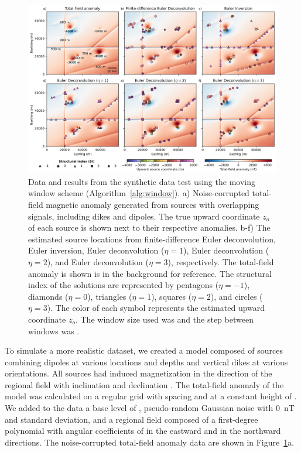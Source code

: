 \begin{figure}[tb!]
\centering
\includegraphics[width=1\linewidth]{figures/synthetic-windows.png}
\caption{
    Data and results from the synthetic data test using the moving window scheme (Algorithm~\ref{alg:window}).
    a) Noise-corrupted total-field magnetic anomaly generated from \SynWinNSources{} sources with overlapping signals, including dikes and dipoles. The true upward coordinate $z_o$ of each source is shown next to their respective anomalies.
    b-f) The estimated source locations from finite-difference Euler deconvolution, Euler inversion, Euler deconvolution ($\eta=1$), Euler deconvolution ($\eta=2$), and Euler deconvolution ($\eta=3$), respectively. The total-field anomaly is shown is in the background for reference.
    The structural index of the solutions are represented by pentagons ($\eta=-1$),  diamonds ($\eta=0$),  triangles ($\eta=1$),  squares ($\eta=2$), and circles ($\eta=3$). 
    The color of each symbol represents the estimated upward coordinate $z_o$. 
    The window size used was \SynWinWindowSize{} and the step between windows was \SynWinWindowStep{}.
}
\label{fig:windows}
\end{figure}

To simulate a more realistic dataset, we created a model composed of \SynWinNSources{} sources combining dipoles at various locations and depths and vertical dikes at various orientations.
All sources had induced magnetization in the direction of the regional field with inclination \SynWinInc{} and declination \SynWinDec{}.
The total-field anomaly of the model was calculated on a regular grid with spacing \SynWinSpacing{} and at a constant height of \SynWinHeight{}.
We added to the data a base level of \SynWinBase{}, pseudo-random Gaussian noise with \qty{0}{\nano\tesla} and \SynWinNoise{} standard deviation, and a regional field composed of a first-degree polynomial with angular coefficients of \SynWinRegionalE{} in the eastward and \SynWinRegionalN{} in the northward directions.
The noise-corrupted total-field anomaly data are shown in Figure~\ref{fig:windows}a.

